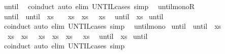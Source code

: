 \begin{isabellebody}
%
\isadelimproof
%
\endisadelimproof
%
\isatagproof
{}\isamarkupfalse%
\ until\ \isamarkupfalse%
\ coinduct\ {\isacharparenleft}auto\ elim{\isacharcolon}\ UNTIL{\isachardot}cases\ simp{\isacharcolon}\ {}{\isacharparenright}%
\endisatagproof
{\isafoldproof}%
%
\isadelimproof
\isanewline
%
\endisadelimproof
\isanewline
{}\isamarkupfalse%
\ until{\isacharunderscore}monoR{\isacharcolon}\isanewline
{}\ until{\isacharcolon}\ {\isachardoublequoteopen}{\isacharparenleft}{\isasymphi}\ until\ {\isasympsi}{}{\isacharparenright}\ xs{\isachardoublequoteclose}\ \ {}{\isacharcolon}\ {\isachardoublequoteopen}{\isasymAnd}\ xs{\isachardot}\ {\isasympsi}{}\ xs\ {\isasymLongrightarrow}\ {\isasympsi}{}\ xs{\isachardoublequoteclose}\isanewline
{}\ {\isachardoublequoteopen}{\isacharparenleft}{\isasymphi}\ until\ {\isasympsi}{}{\isacharparenright}\ xs{\isachardoublequoteclose}\isanewline
%
\isadelimproof
%
\endisadelimproof
%
\isatagproof
{}\isamarkupfalse%
\ until\ \isamarkupfalse%
\ coinduct\ {\isacharparenleft}auto\ elim{\isacharcolon}\ UNTIL{\isachardot}cases\ simp{\isacharcolon}\ {}{\isacharparenright}%
\endisatagproof
{\isafoldproof}%
%
\isadelimproof
\isanewline
%
\endisadelimproof
\isanewline
{}\isamarkupfalse%
\ until{\isacharunderscore}mono{\isacharcolon}\isanewline
{}\ until{\isacharcolon}\ {\isachardoublequoteopen}{\isacharparenleft}{\isasymphi}{}\ until\ {\isasympsi}{}{\isacharparenright}\ xs{\isachardoublequoteclose}\ \isanewline
{}{\isacharcolon}\ {\isachardoublequoteopen}{\isasymAnd}\ xs{\isachardot}\ {\isasymphi}{}\ xs\ {\isasymLongrightarrow}\ {\isasymphi}{}\ xs{\isachardoublequoteclose}\ {\isachardoublequoteopen}{\isasymAnd}\ xs{\isachardot}\ {\isasympsi}{}\ xs\ {\isasymLongrightarrow}\ {\isasympsi}{}\ xs{\isachardoublequoteclose}\isanewline
{}\ {\isachardoublequoteopen}{\isacharparenleft}{\isasymphi}{}\ until\ {\isasympsi}{}{\isacharparenright}\ xs{\isachardoublequoteclose}\isanewline
%
\isadelimproof
%
\endisadelimproof
%
\isatagproof
{}\isamarkupfalse%
\ until\ \isamarkupfalse%
\ coinduct\ {\isacharparenleft}auto\ elim{\isacharcolon}\ UNTIL{\isachardot}cases\ simp{\isacharcolon}\ {}{\isacharparenright}%
\endisatagproof
{\isafoldproof}%

\end{isabellebody}
